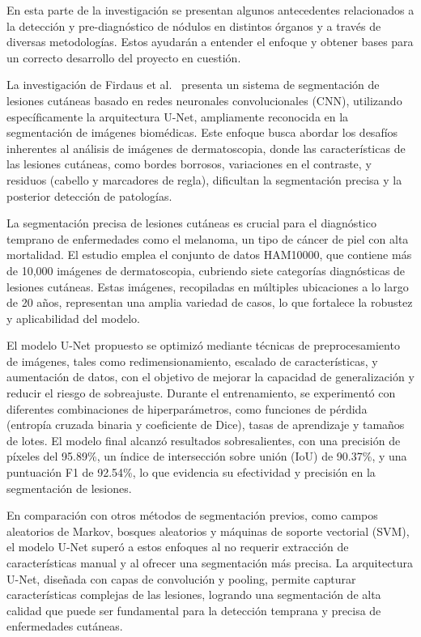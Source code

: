 En esta parte de la investigación se presentan algunos antecedentes relacionados a la detección y pre-diagnóstico de nódulos en distintos órganos y a través de diversas metodologías. Estos ayudarán a entender el enfoque y obtener bases para un correcto desarrollo del proyecto en cuestión.


La investigación de Firdaus et al.\ \cite{firdaus2023} presenta un sistema de segmentación de lesiones cutáneas basado en redes neuronales convolucionales (CNN), utilizando específicamente la arquitectura U-Net, ampliamente reconocida en la segmentación de imágenes biomédicas. Este enfoque busca abordar los desafíos inherentes al análisis de imágenes de dermatoscopia, donde las características de las lesiones cutáneas, como bordes borrosos, variaciones en el contraste, y residuos (cabello y marcadores de regla), dificultan la segmentación precisa y la posterior detección de patologías.

La segmentación precisa de lesiones cutáneas es crucial para el diagnóstico temprano de enfermedades como el melanoma, un tipo de cáncer de piel con alta mortalidad. El estudio emplea el conjunto de datos HAM10000, que contiene más de 10,000 imágenes de dermatoscopia, cubriendo siete categorías diagnósticas de lesiones cutáneas. Estas imágenes, recopiladas en múltiples ubicaciones a lo largo de 20 años, representan una amplia variedad de casos, lo que fortalece la robustez y aplicabilidad del modelo.

El modelo U-Net propuesto se optimizó mediante técnicas de preprocesamiento de imágenes, tales como redimensionamiento, escalado de características, y aumentación de datos, con el objetivo de mejorar la capacidad de generalización y reducir el riesgo de sobreajuste. Durante el entrenamiento, se experimentó con diferentes combinaciones de hiperparámetros, como funciones de pérdida (entropía cruzada binaria y coeficiente de Dice), tasas de aprendizaje y tamaños de lotes. El modelo final alcanzó resultados sobresalientes, con una precisión de píxeles del 95.89\%, un índice de intersección sobre unión (IoU) de 90.37\%, y una puntuación F1 de 92.54\%, lo que evidencia su efectividad y precisión en la segmentación de lesiones.

En comparación con otros métodos de segmentación previos, como campos aleatorios de Markov, bosques aleatorios y máquinas de soporte vectorial (SVM), el modelo U-Net superó a estos enfoques al no requerir extracción de características manual y al ofrecer una segmentación más precisa. La arquitectura U-Net, diseñada con capas de convolución y pooling, permite capturar características complejas de las lesiones, logrando una segmentación de alta calidad que puede ser fundamental para la detección temprana y precisa de enfermedades cutáneas.


